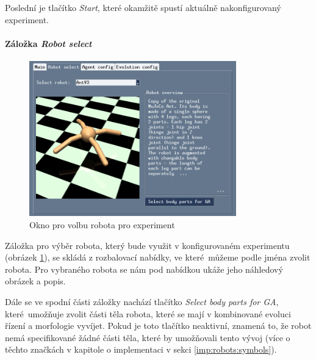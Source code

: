 Poslední je tlačítko \emph{Start}, které okamžitě spustí aktuálně
nakonfigurovaný experiment.

\paragraph{Záložka \emph{Robot select}}
\begin{figure}[!htb]
    \centering
    \includegraphics[width=0.8\textwidth]{../img/GUI_robot_tab.jpg}
    \caption{Okno pro volbu robota pro experiment}
    \label{doc_12_fig:GUI_robot}
\end{figure}

Záložka pro výběr robota, který bude využit v konfigurovaném experimentu
(obrázek \ref{doc_12_fig:GUI_robot}), se skládá z rozbalovací nabídky, ve
které~můžeme podle jména zvolit robota. Pro vybraného robota se nám pod
nabídkou ukáže jeho náhledový obrázek a popis. 

Dále se ve spodní části záložky nachází tlačítko \emph{Select body parts for
GA}, které~umožňuje zvolit části těla robota, které se mají v kombinované
evoluci řízení a morfologie vyvíjet. Pokud je toto tlačítko neaktivní, znamená
to, že robot nemá specifikované žádné části těla, které by umožňovali tento
vývoj (více o těchto značkách v kapitole o implementaci v sekci
\ref{imp:robots:symbols}).

